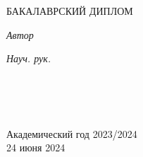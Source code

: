 \documentclass[
11pt, %
english, %
singlespacing, %
headsepline, %
]{MastersDoctoralThesis} %
\theoremstyle{plain}
\theoremstyle{definition}
\theoremstyle{remark}
\begin{document}
\begin{titlepage}
\begin{center}
		{БАКАЛАВРСКИЙ ДИПЛОМ}\vspace{1cm} %
		
		\begin{minipage}[t]{0.4\textwidth}
			\begin{flushleft} \large
				\emph{Автор}\\
				\href{}{\authorname} %
			\end{flushleft}
		\end{minipage}
		\begin{minipage}[t]{0.4\textwidth}
			\begin{flushright} \large
				\emph{Науч. рук.} \\
				\href{}{\supname} \\ %
			\end{flushright}
		\end{minipage}\\[2cm]
		
		\vfill
		
		
		\vfill
		\HRule \\[1cm] %
		{\large Академический год 2023/2024 \\ 24 июня 2024}\\[4cm] %
		
		\vfill
	\end{center}
\end{titlepage}

\clearpage

\end{document}
